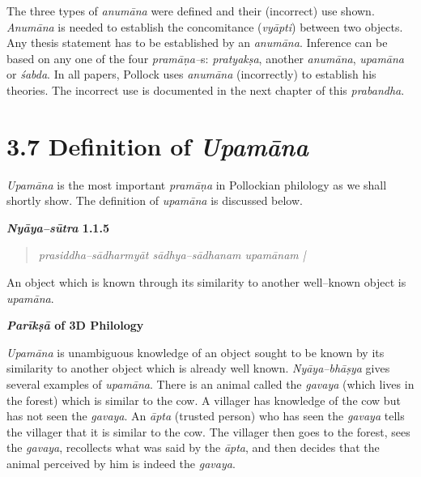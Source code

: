 The three types of \textit{anumāna }were defined and their (incorrect) use shown. \textit{Anumāna} is needed to establish the concomitance (\textit{vyāpti}) between two objects. Any thesis statement has to be established by an \textit{anumāna}. Inference can be based on any one of the four \textit{pramāṇa–}s: \textit{pratyakṣa}, another \textit{anumāna}, \textit{upamāna} or \textit{śabda}. In all papers, Pollock uses \textit{anumāna} (incorrectly) to establish his theories. The incorrect use is documented in the next chapter of this \textit{prabandha}.


\section*{3.7 Definition of {\it {\bfseries Upamāna}}}

\textit{Upamāna }is the most important \textit{pramāṇa} in Pollockian philology as we shall shortly show. The definition of \textit{upamāna} is discussed below.

\textbf{\textit{Nyāya–sūtra} 1.1.5}

\vspace{-.3cm}

\begin{verse}
\textit{prasiddha–sādharmyāt sādhya–sādhanam upamānam |}
\end{verse}

\vspace{-.3cm}

An object which is known through its similarity to another well–known object is \textit{upamāna}.

\textbf{\textit{Parīkṣā} of 3D Philology}

\textit{Upamāna }is unambiguous knowledge of an object sought to be known by its similarity to another object which is already well known. \textit{Nyāya–bhāṣya} gives several examples of \textit{upamāna}. There is an animal called the \textit{gavaya} (which lives in the forest) which is similar to the cow. A villager has knowledge of the cow but has not seen the \textit{gavaya}. An \textit{āpta}	(trusted person) who has seen the \textit{gavaya} tells the villager that it is similar to the cow. The villager then goes to the forest, sees the \textit{gavaya}, recollects what was said by the \textit{āpta}, and then decides that the animal perceived by him is indeed the \textit{gavaya}.

